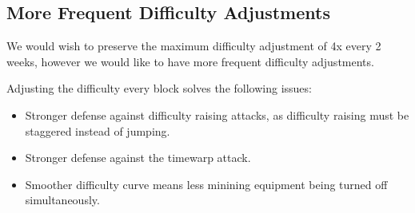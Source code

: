\documentclass[twocolumn]{article}
\begin{document}
\subsection{More Frequent Difficulty Adjustments}
We would wish to preserve the maximum difficulty adjustment of 4x every 2 weeks, however we would like to have more frequent difficulty adjustments.

Adjusting the difficulty every block solves the following issues:
\begin{itemize}
	\item Stronger defense against difficulty raising attacks, as difficulty raising must be staggered instead of jumping.
	\item Stronger defense against the timewarp attack.
	\item Smoother difficulty curve means less minining equipment being turned off simultaneously.
\end{itemize}



\end{document}
